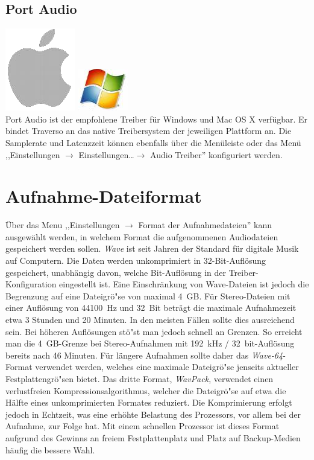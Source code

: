 \subsection{Port Audio}
\includegraphics[height=\baselineskip]{../images/mac.png}
\includegraphics[height=\baselineskip]{../images/win.png}
\\
Port Audio ist der empfohlene Treiber für Windows und Mac OS X verfügbar. Er bindet Traverso an das native Treibersystem der jeweiligen Plattform an. Die Samplerate und Latenzzeit können ebenfalls über die Menüleiste oder das Menü ,,Einstellungen $\rightarrow$ Einstellungen\dots $\rightarrow$ Audio Treiber'' konfiguriert werden.

\section{Aufnahme-Dateiformat}
Über das Menu ,,Einstellungen $\rightarrow$ Format der Aufnahmedateien'' kann ausgewählt werden, in welchem Format die aufgenommenen Audiodateien gespeichert werden sollen. \emph{Wave} ist seit Jahren der Standard für digitale Musik auf Computern. Die Daten werden unkomprimiert in 32-Bit-Auflösung gespeichert, unabhängig davon, welche Bit-Auflösung in der Treiber-Konfiguration eingestellt ist. Eine Einschränkung von Wave-Dateien ist jedoch die Begrenzung auf eine Dateigrö"se von maximal 4~GB. Für Stereo-Dateien mit einer Auflösung von 44100~Hz und 32~Bit beträgt die maximale Aufnahmezeit etwa 3 Stunden und 20 Minuten. In den meisten Fällen sollte dies ausreichend sein. Bei höheren Auflösungen stö"st man jedoch schnell an Grenzen. So erreicht man die 4~GB-Grenze bei Stereo-Aufnahmen mit 192~kHz / 32~bit-Auflösung bereits nach 46 Minuten. Für längere Aufnahmen sollte daher das \emph{Wave-64}-Format verwendet werden, welches eine maximale Dateigrö"se jenseits aktueller Festplattengrö"sen bietet. Das dritte Format, \emph{WavPack}, verwendet einen verlustfreien Kompressionsalgorithmus, welcher die Dateigrö"se auf etwa die Hälfte eines unkomprimierten Formates reduziert. Die Komprimierung erfolgt jedoch in Echtzeit, was eine erhöhte Belastung des Prozessors, vor allem bei der Aufnahme, zur Folge hat. Mit einem schnellen Prozessor ist dieses Format aufgrund des Gewinns an freiem Festplattenplatz und Platz auf Backup-Medien häufig die bessere Wahl.
